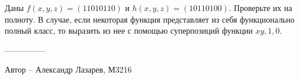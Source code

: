 \question
Даны $f(x, y, z) = (11010110)$ и $h(x, y, z) = (10110100)$. Проверьте их на полноту. В случае, если некоторая функция представляет из себя функционально полный класс, то выразить из нее с помощью суперпозиций функции $xy, 1, 0$.

---------------

Автор -- Александр Лазарев, М3216